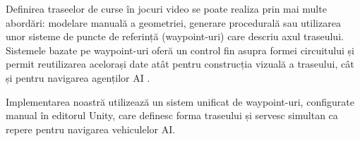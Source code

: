 Definirea traseelor de curse în jocuri video se poate realiza prin mai multe abordări: modelare manuală a geometriei, generare procedurală \cite{shaker2016procedural} sau utilizarea unor sisteme de puncte de referință (waypoint-uri) care descriu axul traseului. Sistemele bazate pe waypoint-uri oferă un control fin asupra formei circuitului și permit reutilizarea acelorași date atât pentru construcția vizuală a traseului, cât și pentru navigarea agenților AI \cite{rabin2009introduction}.

Implementarea noastră utilizează un sistem unificat de waypoint-uri, configurate manual în editorul Unity, care definesc forma traseului și servesc simultan ca repere pentru navigarea vehiculelor AI.
